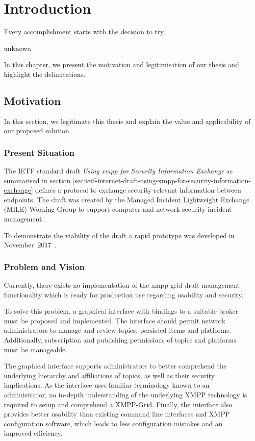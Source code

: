 \newcommand{\code}{\texttt}
\chapter{Introduction}
\label{sec:introduction}

\epigraph{Every accomplishment starts with the decision to try.}{unknown}
In this chapter, we present the motivation and legitimisation of our thesis and highlight the delimitations.

\section{Motivation}
In this section, we legitimate this thesis and explain the value and applicability of our proposed solution.

\subsection{Present Situation}
The IETF standard draft \emph{Using \gls{xmpp} for Security Information Exchange} \cite{ietf-mile-xmpp-grid-05} as summarised in section \ref{sec:ietf-internet-draft-using-xmpp-for-security-information-exchange} defines a protocol to exchange security-relevant information between endpoints.
The draft was created by the Managed Incident Lightweight Exchange (MILE) Working Group to support computer and network security incident management.

To demonstrate the viability of the draft a rapid prototype was developed in November~2017~\cite{xmpp-grid-prototype}.

\subsection{Problem and Vision}
Currently, there exists no implementation of the \gls{xmpp} grid draft management functionality which is ready for production use regarding usability and security.

To solve this problem, a graphical interface with bindings to a suitable \gls{broker} must be proposed and implemented.
The interface should permit network administrators to manage and review \glspl{topic}, persisted items and \glspl{platform}.
Additionally, subscription and publishing permissions of \glspl{topic} and \glspl{platform} must be manageable.

The graphical interface supports administrators to better comprehend the underlying hierarchy and affiliations of \glspl{topic}, as well as their security implications.
As the interface uses familiar terminology known to an administrator, no in-depth understanding of the underlying XMPP technology is required to setup and comprehend a XMPP-Grid.
Finally, the interface also provides better usability than existing command line interfaces and XMPP configuration software, which leads to less configuration mistakes and an improved efficiency.

